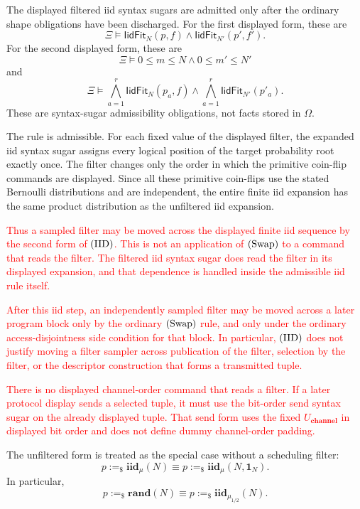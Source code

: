\documentclass[acmsmall,screen,review,anonymous,nonacm]{acmart}
\theoremstyle{defn_style}
\begin{document}
The displayed filtered iid syntax sugars are admitted only after the ordinary
shape obligations have been discharged.  For the first displayed form, these are
\[
\Xi\vDash
\mathsf{IidFit}_N(p,f)
\land
\mathsf{IidFit}_{N'}(p',f').
\]
For the second displayed form, these are
\[
\Xi\vDash
0\le m\le N
\land
0\le m'\le N'
\]
and
\[
\Xi\vDash
\bigwedge_{a=1}^{r}
\mathsf{IidFit}_N(p_a,f)
\land
\bigwedge_{a=1}^{r}
\mathsf{IidFit}_{N'}(p'_a).
\]
These are syntax-sugar admissibility obligations, not facts stored in
\(\Omega\).

The rule is admissible.  For each fixed value of the displayed filter, the
expanded iid syntax sugar assigns every logical position of the target
probability root exactly once.  The filter changes only the order in which the
primitive coin-flip commands are displayed.  Since all these primitive
coin-flips use the stated Bernoulli distributions and are independent, the
entire finite iid expansion has the same product distribution as the
unfiltered iid expansion.

\textcolor{red}{Thus a sampled filter may be moved across the displayed finite iid sequence by the second form of \({\rm (IID)}\). This is not an application of \({\rm (Swap)}\) to a command that reads the filter. The filtered iid syntax sugar does read the filter in its displayed expansion, and that dependence is handled inside the admissible iid rule itself.}

\textcolor{red}{After this iid step, an independently sampled filter may be moved across a later program block only by the ordinary \({\rm (Swap)}\) rule, and only under the ordinary access-disjointness side condition for that block. In particular, \({\rm (IID)}\) does not justify moving a filter sampler across publication of the filter, selection by the filter, or the descriptor construction that forms a transmitted tuple.}

\textcolor{red}{There is no displayed channel-order command that reads a filter.  If a later protocol display sends a selected tuple, it must use the bit-order send syntax sugar on the already displayed tuple.  That send form uses the fixed \(U_{\textbf{channel}}\) in displayed bit order and does not define  dummy channel-order padding.}

The unfiltered form is treated as the special case without a scheduling
filter:
\[
p:=_{\$}\mathbf{iid}_{\mu}(N)
\equiv
p:=_{\$}\mathbf{iid}_{\mu}(N,\mathbf 1_N).
\]
In particular,
\[
p:=_{\$}\mathbf{rand}(N)
\equiv
p:=_{\$}\mathbf{iid}_{\mu_{1/2}}(N).
\]
\end{document}
